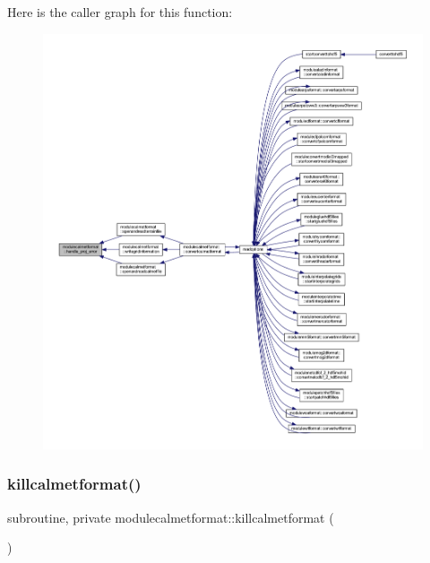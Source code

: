 Here is the caller graph for this function\+:\nopagebreak
\begin{figure}[H]
\begin{center}
\leavevmode
\includegraphics[width=350pt]{namespacemodulecalmetformat_a2e6285b2b96d5b3545d7755b77b65502_icgraph}
\end{center}
\end{figure}
\mbox{\label{namespacemodulecalmetformat_a7703da81b5a94320621a668c0326f881}} 
\subsubsection{\texorpdfstring{killcalmetformat()}{killcalmetformat()}}
{\footnotesize\ttfamily subroutine, private modulecalmetformat\+::killcalmetformat (\begin{DoxyParamCaption}{ }\end{DoxyParamCaption})\hspace{0.3cm}{\ttfamily [private]}}

